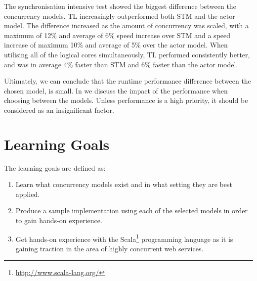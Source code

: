 The synchronisation intensive test showed the biggest difference between the concurrency models. \ac{TL} increasingly outperformed both \ac{STM} and the actor model. The difference increased as the amount of concurrency was scaled, with a maximum of 12\% and average of 6\% speed increase over \ac{STM} and a speed increase of maximum 10\% and average of 5\% over the actor model. When utilising all of the logical cores simultaneously, \ac{TL} performed consistently better, and was in average 4\% faster than \ac{STM} and 6\% faster than the actor model.

Ultimately, we can conclude that the runtime performance difference between the chosen model, is small. In  we discuss the impact of the performance when choosing between the models. Unless performance is a high priority, it should be considered as an insignificant factor.

\section{Learning Goals}

The learning goals are defined as:
\begin{enumerate}
\item Learn what concurrency models exist and in what setting they are best applied.
\item Produce a sample implementation using each of the selected models in order to gain hands-on experience.
\item Get hands-on experience with the Scala\footnote{\url{http://www.scala-lang.org/}} programming language as it is gaining traction in the area of highly concurrent web services.
\end{enumerate}
\worksheetend